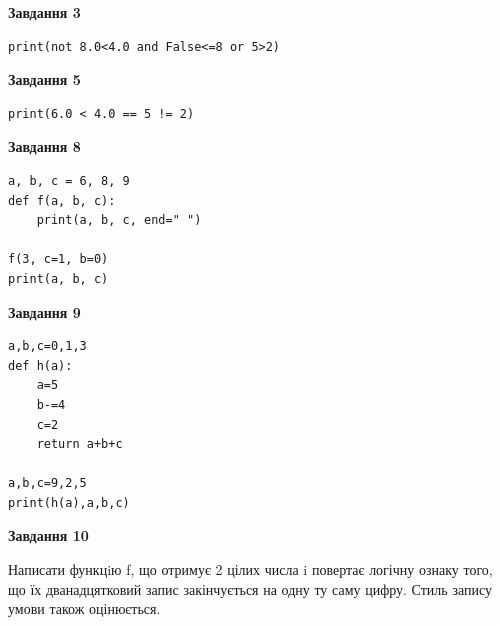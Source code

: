 \documentclass[12pt, ukrainian]{article}
\begin{document}
{\begin {large}
\begin{minipage}[t]{7.5cm}
\end{minipage}
\vline \hspace{6mm}
\begin{minipage}[t]{10.5cm}

\begin{center}
\textbf{Завдання 3}
\end{center}

\begin{verbatim}
print(not 8.0<4.0 and False<=8 or 5>2)
\end{verbatim}



\begin{center}
\textbf{Завдання 5}
\end{center}

\begin{verbatim}
print(6.0 < 4.0 == 5 != 2)
\end{verbatim}



\begin{center}
\textbf{Завдання 8}
\end{center}

\begin{verbatim}
a, b, c = 6, 8, 9
def f(a, b, c):
    print(a, b, c, end=" ")

f(3, c=1, b=0)
print(a, b, c)
\end{verbatim}



\begin{center}
\textbf{Завдання 9}
\end{center}

\begin{verbatim}
a,b,c=0,1,3
def h(a):
    a=5
    b-=4
    c=2
    return a+b+c

a,b,c=9,2,5
print(h(a),a,b,c)
\end{verbatim}



\begin{center}
\textbf{Завдання 10}
\end{center}

Написати функцiю f, що отримує 2 цілих числа i повертає логічну ознаку того, що їх дванадцятковий запис закінчується на одну ту саму цифру. Стиль запису умови також оцінюється.\par

\end{minipage}

\end {large}}
\newpage
\end{document}
